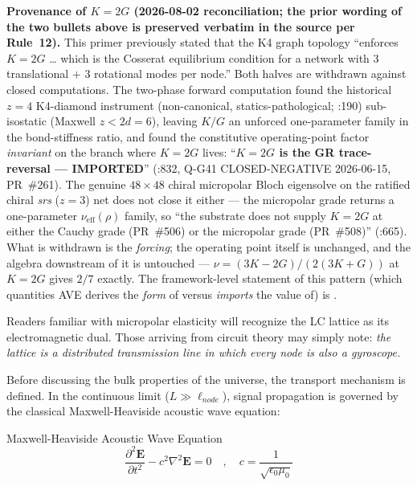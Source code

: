 \noindent\textbf{Provenance of $K = 2G$ (2026-08-02 reconciliation; the prior wording of the two bullets above is preserved verbatim in the source per Rule~12).} This primer previously stated that the K4 graph topology ``enforces $K = 2G$ \ldots{} which is the Cosserat equilibrium condition for a network with 3 translational $+$ 3 rotational modes per node.'' Both halves are withdrawn against closed computations. The two-phase forward computation found the historical $z=4$ K4-diamond instrument (non-canonical, statics-pathological; :190) sub-isostatic (Maxwell $z < 2d = 6$), leaving $K/G$ an unforced one-parameter family in the bond-stiffness ratio, and found the constitutive operating-point factor \emph{invariant} on the branch where $K = 2G$ lives: ``\textbf{$K=2G$ is the GR trace-reversal --- IMPORTED}'' (:832, Q-G41 CLOSED-NEGATIVE 2026-06-15, PR~\#261). The genuine $48\times48$ chiral micropolar Bloch eigensolve on the ratified chiral \emph{srs} ($z=3$) net does not close it either --- the micropolar grade returns a one-parameter $\nu_\text{eff}(\rho)$ family, so ``the substrate does not supply $K = 2G$ at either the Cauchy grade (PR~\#506) or the micropolar grade (PR~\#508)'' (:665). What is withdrawn is the \emph{forcing}; the operating point itself is unchanged, and the algebra downstream of it is untouched --- $\nu = (3K-2G)/(2(3K+G))$ at $K = 2G$ gives $2/7$ exactly. The framework-level statement of this pattern (which quantities AVE derives the \emph{form} of versus \emph{imports} the value of) is .

Readers familiar with micropolar elasticity will recognize the LC lattice as its electromagnetic dual. Those arriving from circuit theory may simply note: \textit{the lattice is a distributed transmission line in which every node is also a gyroscope.}

Before discussing the bulk properties of the universe, the transport mechanism is defined. In the continuous limit ($L \gg \ell_{node}$), signal propagation is governed by the classical Maxwell-Heaviside acoustic wave equation:
\begin{resultbox}{Maxwell-Heaviside Acoustic Wave Equation}
\begin{equation}
    \frac{\partial^2 \mathbf{E}}{\partial t^2} - c^2 \nabla^2 \mathbf{E} = 0 \quad , \quad c = \frac{1}{\sqrt{\epsilon_0 \mu_0}}
\end{equation}
\end{resultbox}

